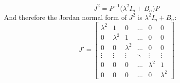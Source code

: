 \documentclass[crop=false,class=article]{standalone}                           %
\begin{document}
        \begin{equation}
            J^{2}=P^{\minus{1}}\big(\lambda^{2}I_{n}+B_{n}\big)P
        \end{equation}
        And therefore the Jordan normal form of $J^{2}$ is
        $\lambda^{2}I_{n}+B_{n}$:
        \begin{equation}
            J'=
            \begin{bmatrix}
                \lambda^{2}&1&0&\dots&0&0\\
                0&\lambda^{2}&1&\dots&0&0\\
                0&0&\lambda^{2}&\dots&0&0\\
                \vdots&\vdots&\vdots&\ddots&\vdots&\vdots\\
                0&0&0&\dots&\lambda^{2}&1\\
                0&0&0&\dots&0&\lambda^{2}
            \end{bmatrix}
        \end{equation}
\end{document}
